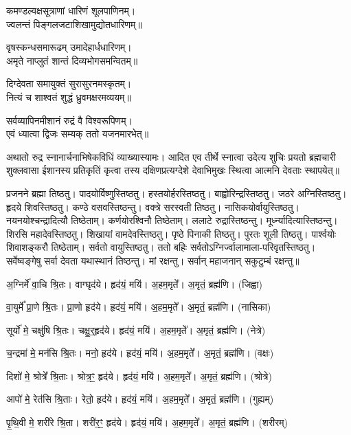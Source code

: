 कमण्डल्वक्षसूत्राणां धारिणं शूलपाणिनम्।\\
ज्वलन्तं पिङ्गलजटाशिखामुद्योतधारिणम्॥

वृषस्कन्धसमारूढम् उमादेहार्धधारिणम्।\\
अमृते  नाप्लुतं शान्तं दिव्यभोगसमन्वितम्॥

दिग्देवता समायुक्तं सुरासुरनमस्कृतम्।\\
नित्यं च शाश्वतं शुद्धं ध्रुवमक्षरमव्ययम्॥

सर्वव्यापिनमीशानं रुद्रं वै विश्वरूपिणम्।\\
एवं ध्यात्वा द्विजः सम्यक् ततो यजनमारभेत्॥

अथातो रुद्र स्नानार्चनाभिषेकविधिं व्याख्यास्यामः। आदित एव तीर्थे स्नात्वा उदेत्य शुचिः
प्रयतो ब्रह्मचारी शुक्लवासा ईशानस्य प्रतिकृतिं कृत्वा तस्य दक्षिणप्रत्यग्देशे देवाभिमुखः स्थित्वा आत्मनि देवताः स्थापयेत्॥

प्रजनने ब्रह्मा तिष्ठतु। पादयोर्विष्णुस्तिष्ठतु। 
हस्तयोर्हरस्तिष्ठतु। बाह्वोरिन्द्रस्\-तिष्ठतु। 
जठरे अग्निस्तिष्ठतु। हृदये शिवस्तिष्ठतु। 
कण्ठे वसवस्तिष्ठन्तु। वक्त्रे सरस्वती तिष्ठतु। 
नासिकयोर्\-वायुस्तिष्ठतु। नयनयोश्चन्द्रादित्यौ तिष्ठेताम्। 
कर्णयोरश्विनौ तिष्ठेताम्। ललाटे रुद्रास्तिष्ठन्तु। 
मूर्ध्न्यादित्यास्तिष्ठन्तु। शिरसि महादेवस्तिष्ठतु। 
शिखायां वामदेवस्तिष्ठतु। पृष्ठे पिनाकी तिष्ठतु। 
पुरतः शूली तिष्ठतु। पार्श्वयोः शिवाशङ्करौ तिष्ठेताम्। 
सर्वतो वायुस्तिष्ठतु। ततो बहिः सर्वतोऽग्निर्ज्वालामाला-परिवृतस्तिष्ठतु।
सर्वेष्वङ्गेषु सर्वा देवता यथास्थानं तिष्ठन्तु। मां रक्षन्तु।
\lbrack सर्वान् महाजनान् सकुटुम्बं रक्षन्तु॥\rbrack

अ॒ग्निर्मे॑ वा॒चि श्रि॒तः।   वाग्घृद॑ये।   हृद॑यं॒ मयि॑।   अ॒हम॒मृते᳚।   अ॒मृतं॒ ब्रह्म॑णि। (जिह्वा)

 वा॒युर्मे᳚ प्रा॒णे श्रि॒तः।   प्रा॒णो हृद॑ये।   हृद॑यं॒ मयि॑।   अ॒हम॒मृते᳚।   अ॒मृतं॒ ब्रह्म॑णि। (नासिका)

   सूर्यो॑ मे॒ चक्षु॑षि श्रि॒तः।   चक्षु॒र्‌॒हृद॑ये।   हृद॑यं॒ मयि॑।   अ॒हम॒मृते᳚।   अ॒मृतं॒ ब्रह्म॑णि। (नेत्रे)

   च॒न्द्रमा॑ मे॒ मन॑सि श्रि॒तः।   मनो॒ हृद॑ये।   हृद॑यं॒ मयि॑।   अ॒हम॒मृते᳚।   अ॒मृतं॒ ब्रह्म॑णि। (वक्षः)

   दिशो॑ मे॒ श्रोत्रे᳚ श्रि॒ताः।   श्रोत्र॒ꣳ॒ हृद॑ये।   हृद॑यं॒ मयि॑।   अ॒हम॒मृते᳚।   अ॒मृतं॒ ब्रह्म॑णि। (श्रोत्रे)

   आपो॑ मे॒ रेत॑सि श्रि॒ताः।   रेतो॒ हृद॑ये।   हृद॑यं॒ मयि॑।   अ॒हम॒मृते᳚।   अ॒मृतं॒ ब्रह्म॑णि। (गुह्यम्)

   पृ॒थि॒वी मे॒ शरी॑रे श्रि॒ता।   शरी॑र॒ꣳ॒ हृद॑ये।   हृद॑यं॒ मयि॑।   अ॒हम॒मृते᳚।   अ॒मृतं॒ ब्रह्म॑णि। (शरीरम्)

